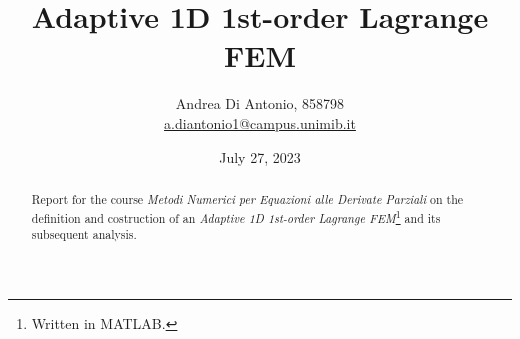 \documentclass[12pt]{article}
\title{Adaptive 1D 1st-order Lagrange FEM}
\author{Andrea Di Antonio, 858798 \\ \hyperlink{mailto:a.diantonio1@campus.unimib.it}{a.diantonio1@campus.unimib.it}}
\date{July 27, 2023}
\begin{document}
	\maketitle
	\thispagestyle{fancy}
	
	\begin{abstract}
		\begin{center}
            Report for the course \textit{Metodi Numerici per Equazioni alle Derivate Parziali} on the definition and costruction of an \textit{Adaptive 1D 1st-order Lagrange FEM}\footnote{Written in MATLAB.} and its subsequent analysis.
        \end{center}
	\end{abstract}
\end{document}
